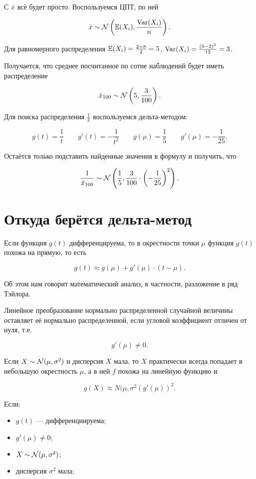 \documentclass[12pt, a4paper, oneside]{article}
\begin{document}
\begin{sol}
С $\bar{x}$ всё будет просто. Воспользуемся ЦПТ, по ней 

$$
\bar{x}\sim \mathcal{N} \left( \mathbb{E}(X_i), \frac{\operatorname{Var}(X_i)}{n} \right).
$$

Для равномерного распределения $\mathbb{E}(X_i) = \frac{2 + 8}{2} = 5$, $\operatorname{Var}(X_i) = \frac{(8-2)^2}{12} = 3$.

Получается, что среднее посчитанное по сотне наблюдений будет иметь распределение 

$$
\bar{x}_{100} \sim \mathcal{N} \left( 5, \frac{3}{100} \right).
$$

Для поиска распределения $\frac{1}{\bar{x}}$ воспользуемся дельта-методом: 

$$
g(t) = \frac{1}{t} \qquad g'(t) = -\frac{1}{t^2} \qquad g(\mu) = \frac{1}{5} \qquad g'(\mu) = - \frac{1}{25}.
$$

Остаётся только подставить  найденные значения в формулу и получить, что 

$$
\frac{1}{\bar{x}_{100}} \sim \mathcal{N} \left( \frac{1}{5}, \frac{3}{100} \cdot \left(-\frac{1}{25} \right)^2\right).
$$
\end{sol}


\section*{Откуда берётся дельта-метод}

Если функция $g(t)$ дифференцируема, то в окрестности точки $\mu$ функция $g(t)$ похожа на прямую, то есть 

$$
g(t) \approx g(\mu) + g'(\mu) \cdot (t - \mu).
$$

Об этом нам говорит математический анализ, в частности, разложение в ряд Тэйлора. 

Линейное преобразование нормально распределенной случайной величины оставляет её нормально распределенной, если угловой коэффициент отличен от нуля, т.е. 

$$
g'(\mu) \neq 0.
$$ 

Если $X \sim \mathcal{N}(\mu, \sigma^2)$ и  дисперсия $X$ мала, то $X$ практически всегда попадает в небольшую окрестность $\mu$, а в ней $f$ похожа на линейную функцию и 

$$
g(X) \approx N(\mu, \sigma^2 (g'(\mu))^2.
$$ 

 Если: 

\begin{itemize}
	\item  $g(t)$ --- дифференциируема;
	\item  $g'(\mu) \neq 0$;
	\item $X \sim \mathcal{N}(\mu,\sigma^2)$;
	\item дисперсия $\sigma^2$ мала;
\end{itemize} 
\end{document}
